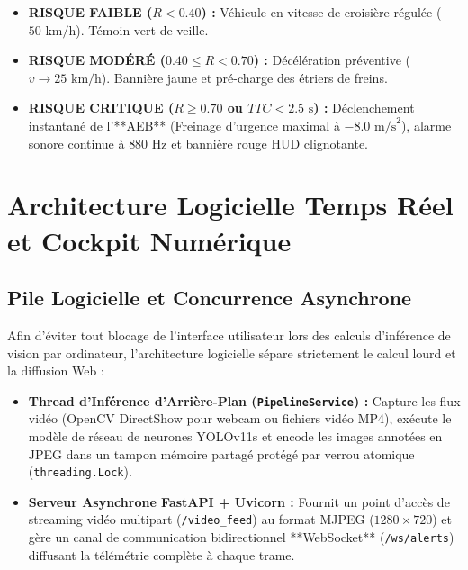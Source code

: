 \documentclass[11pt,a4paper]{article}
\begin{document}
\begin{tcolorbox}[colback=white, colframe=pradasamber, title=Politique de Décision et Actionneur de Freinage]
\begin{itemize}
    \item \textbf{RISQUE FAIBLE ($R < 0.40$) :} Véhicule en vitesse de croisière régulée ($50\text{ km/h}$). Témoin vert de veille.
    \item \textbf{RISQUE MODÉRÉ ($0.40 \le R < 0.70$) :} Décélération préventive ($v \to 25\text{ km/h}$). Bannière jaune et pré-charge des étriers de freins.
    \item \textbf{RISQUE CRITIQUE ($R \ge 0.70$ ou $TTC < 2.5\text{ s}$) :} Déclenchement instantané de l'**AEB** (Freinage d'urgence maximal à $-8.0\text{ m/s}^2$), alarme sonore continue à $880\text{ Hz}$ et bannière rouge HUD clignotante.
\end{itemize}
\end{tcolorbox}

\section{Architecture Logicielle Temps Réel et Cockpit Numérique}

\subsection{Pile Logicielle et Concurrence Asynchrone}
Afin d'éviter tout blocage de l'interface utilisateur lors des calculs d'inférence de vision par ordinateur, l'architecture logicielle sépare strictement le calcul lourd et la diffusion Web :
\begin{itemize}
    \item \textbf{Thread d'Inférence d'Arrière-Plan (\texttt{PipelineService}) :} Capture les flux vidéo (OpenCV DirectShow pour webcam ou fichiers vidéo MP4), exécute le modèle de réseau de neurones YOLOv11s et encode les images annotées en JPEG dans un tampon mémoire partagé protégé par verrou atomique (\texttt{threading.Lock}).
    \item \textbf{Serveur Asynchrone FastAPI + Uvicorn :}
    Fournit un point d'accès de streaming vidéo multipart (\texttt{/video\_feed}) au format MJPEG ($1280\times 720$) et gère un canal de communication bidirectionnel **WebSocket** (\texttt{/ws/alerts}) diffusant la télémétrie complète à chaque trame.
\end{itemize}
\end{document}
